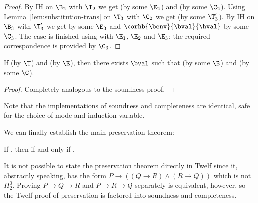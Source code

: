 \begin{proof}
By IH on $\B_2$ with $\T_2$ we get  (by some $\E_2$) and  (by some $\C_2$).
Using Lemma~\ref{lem:substitution-trans} on $\T_3$ with $\C_2$ we get  (by some $\T_3'$).
By IH on $\B_3$ with $\T_3'$ we get  by some $\E_3$ and $\corhb{\benv}{\bval}{\hval}$ by some $\C_3$.
The case is finished using  with $\E_1$, $\E_2$ and $\E_3$; the required correspondence is provided by $\C_3$.

\end{proof}

\begin{lemma}[Completeness]
\label{lem:completeness-hb}
If \trahb{\benv}{\envnil}{\hexp}{\bexp} (by $\T$) and \hev{\hexp}{\hval} (by $\E$), then there exists $\bval$ such that \bev{\benv}{\bexp}{\bval} (by some $\B$) and \corhb{\benv}{\bval}{\hval} (by some $\C$).
\end{lemma}


\begin{proof}
Completely analogous to the soundness proof.
\end{proof}

\Twelf
Note that the implementations of soundness and completeness are identical, safe for the choice of mode and induction variable.

\vspace{0.5cm}

\noindent We can finally establish the main preservation theorem:

\begin{theorem}
\label{thm:preservation-hb} If \trahb{\benv}{\envnil}{\bexp}{\hexp}, then \hev{\hexp}{\n{\nat}} if and only if \bev{\envnil}{\bexp}{\n{\nat}}.
\end{theorem}


\Twelf
It is not possible to state the preservation theorem directly in Twelf since it, abstractly speaking, has the form $P \rightarrow ((Q \rightarrow R) \wedge (R \rightarrow Q))$ which is not $\Pi_2^0$.
Proving $P \rightarrow Q \rightarrow R$ and $P \rightarrow R \rightarrow Q$ separately is equivalent, however, so the Twelf proof of preservation is factored into soundness and completeness.

